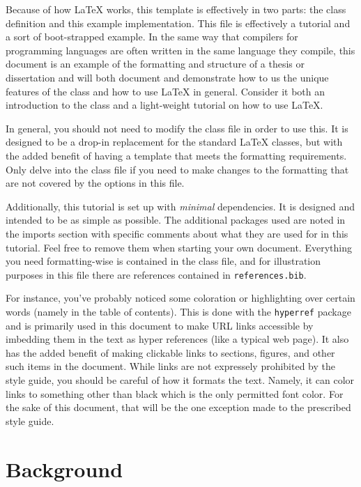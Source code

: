 \documentclass{thesis-dissertation}
\begin{document}
Because of how \LaTeX{} works, this template is effectively in two parts: the class definition and this example implementation. This file is effectively a tutorial and a sort of boot-strapped example. In the same way that compilers for programming languages are often written in the same language they compile, this document is an example of the formatting and structure of a thesis or dissertation and will both document and demonstrate how to us the unique features of the class and how to use \LaTeX{} in general. Consider it both an introduction to the class and a light-weight tutorial on how to use \LaTeX{}.

In general, you should not need to modify the class file in order to use this. It is designed to be a drop-in replacement for the standard \LaTeX{} classes, but with the added benefit of having a template that meets the formatting requirements. Only delve into the class file if you need to make changes to the formatting that are not covered by the options in this file.

Additionally, this tutorial is set up with \textit{minimal} dependencies. It is designed and intended to be as simple as possible. The additional packages used are noted in the imports section with specific comments about what they are used for in this tutorial. Feel free to remove them when starting your own document. Everything you need formatting-wise is contained in the class file, and for illustration purposes in this file there are references contained in \verb|references.bib|. 

For instance, you've probably noticed some coloration or highlighting over certain words (namely in the table of contents). This is done with the \texttt{hyperref} package and is primarily used in this document to make URL links accessible by imbedding them in the text as hyper references (like a typical web page). It also has the added benefit of making clickable links to sections, figures, and other such items in the document. While links are not expressely prohibited by the style guide, you should be careful of how it formats the text. Namely, it can color links to something other than black which is the only permitted font color. For the sake of this document, that will be the one exception made to the prescribed style guide.
\chapter{Background}
\end{document}
